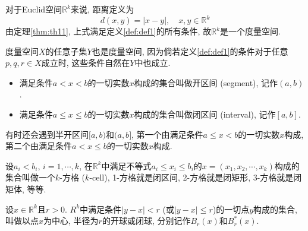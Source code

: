 \documentclass[cn,12pt,math=mtpro2,citestyle=gb7714-2015,bibstyle=gb7714-2015,twocol]{elegantbook}
\newcommand{\R}{\mathbb{R}}
\begin{document}
\begin{example}
对于Euclid空间$\R^k$来说, 距离定义为
$$d(x,y )=|x-y |,\quad x,y \in\R^k$$
由定理\ref{thm:th11}, 上式满足定义\ref{def:def1}的所有条件, 故$\R^k$是一个度量空间.
\end{example}
\begin{remark}
度量空间$X$的任意子集$Y$也是度量空间, 因为倘若定义\ref{def:def1}的条件对于任意$p, q, r\in X$成立时, 这些条件自然在$Y$中也成立.
\end{remark}
\begin{definition}
\begin{itemize}
\item 满足条件$a<x<b$的一切实数$x$构成的集合叫做开区间 (segment), 记作$(a,b)$.

\item 满足条件$a\leq x\leq b$的一切实数$x$构成的集合叫做闭区间 (interval), 记作$[a,b]$.
\end{itemize}
\end{definition}
有时还会遇到半开区间$[a,b)$和$(a,b]$, 第一个由满足条件$a\leq x<b$的一切实数$x$构成, 第二个由满足条件$a<x\leq b$的一切实数$x$构成.

设$a_i<b_i$, $i=1,\cdots,k$, 在$\R^k$中满足不等式$a_i\leq x_i\leq b_i$的$x=(x_1,x_2,\cdots,x_k)$构成的集合叫做一个$k$-方格 ($k$-cell), 1-方格就是闭区间, 2-方格就是闭矩形, 3-方格就是闭矩体, 等等.

设$x\in\R^k$且$r>0$. $R^k$中满足条件$|y-x|<r$ (或$|y-x|\leq r$)的一切点$y$构成的集合, 叫做以点$x$为中心, 半径为$r$的开球或闭球, 分别记作$B_r(x)$和$B_r^\ast(x)$.
\end{document}
